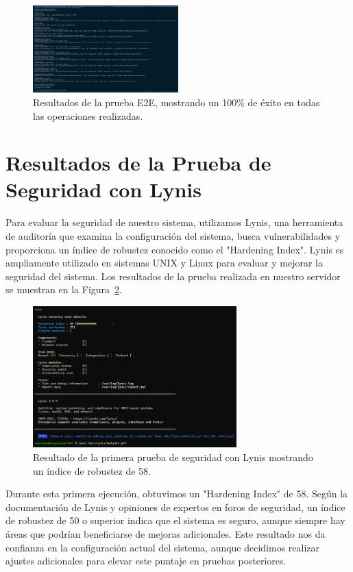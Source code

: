 \begin{figure}[H]
    \centering
    \includegraphics[width=0.5\textwidth]{figuras/e2etest.png}
    \caption{Resultados de la prueba E2E, mostrando un 100\% de éxito en todas las operaciones realizadas.}
    \label{fig:e2etest}
\end{figure}

\section{Resultados de la Prueba de Seguridad con Lynis}

Para evaluar la seguridad de nuestro sistema, utilizamos Lynis, una herramienta de auditoría que examina la configuración del sistema, busca vulnerabilidades y proporciona un índice de robustez conocido como el "Hardening Index". Lynis es ampliamente utilizado en sistemas UNIX y Linux para evaluar y mejorar la seguridad del sistema. Los resultados de la prueba realizada en nuestro servidor se muestran en la Figura~\ref{fig:primeraPruebaLynis}.

\begin{figure}[H]
    \centering
    \includegraphics[width=0.7\textwidth]{figuras/primeraPruebaLynis.png}
    \caption{Resultado de la primera prueba de seguridad con Lynis mostrando un índice de robustez de 58.}
    \label{fig:primeraPruebaLynis}
\end{figure}

Durante esta primera ejecución, obtuvimos un "Hardening Index" de 58. Según la documentación de Lynis y opiniones de expertos en foros de seguridad, un índice de robustez de 50 o superior indica que el sistema es seguro, aunque siempre hay áreas que podrían beneficiarse de mejoras adicionales. Este resultado nos da confianza en la configuración actual del sistema, aunque decidimos realizar ajustes adicionales para elevar este puntaje en pruebas posteriores.

